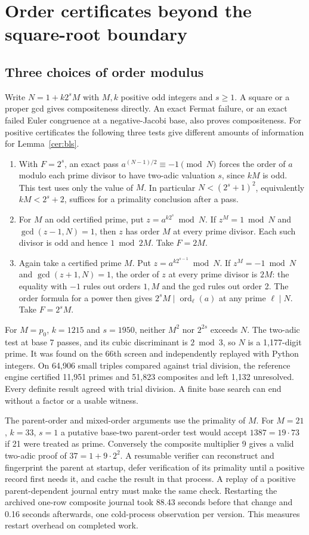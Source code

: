 \documentclass[11pt,a4paper,oneside,openany]{report}
\begin{document}
\chapter{Order certificates beyond the square-root boundary}
\label{cer:orderchap}
\section{Three choices of order modulus}

Write $N=1+k2^sM$ with $M,k$ positive odd integers and $s\ge1$. A square or a proper gcd gives compositeness directly. An exact Fermat failure, or an exact failed Euler congruence at a negative-Jacobi base, also proves compositeness. For positive certificates the following three tests give different amounts of information for Lemma~\ref{cer:bls}.
\begin{enumerate}
\item With $F=2^s$, an exact pass $a^{(N-1)/2}\equiv-1\pmod N$ forces the order of $a$ modulo each prime divisor to have two-adic valuation $s$, since $kM$ is odd. This test uses only the value of $M$. In particular $N<(2^s+1)^2$, equivalently $kM<2^s+2$, suffices for a primality conclusion after a pass.
\item For $M$ an odd certified prime, put $z=a^{k2^s}\bmod N$. If $z^M=1\bmod N$ and $\gcd(z-1,N)=1$, then $z$ has order $M$ at every prime divisor. Each such divisor is odd and hence $1\bmod 2M$. Take $F=2M$.
\item Again take a certified prime $M$. Put $z=a^{k2^{s-1}}\bmod N$. If $z^M=-1\bmod N$ and $\gcd(z+1,N)=1$, the order of $z$ at every prime divisor is $2M$: the equality with $-1$ rules out orders $1,M$ and the gcd rules out order 2. The order formula for a power then gives $2^sM\mid\operatorname{ord}_{\ell}(a)$ at any prime $\ell\mid N$. Take $F=2^sM$.
\end{enumerate}

For $M=p_0$, $k=1215$ and $s=1950$, neither $M^2$ nor $2^{2s}$ exceeds $N$. The two-adic test at base 7 passes, and its cubic discriminant is $2\bmod3$, so $N$ is a 1,177-digit prime. It was found on the 66th screen and independently replayed with Python integers. On 64,906 small triples compared against trial division, the reference engine certified 11,951 primes and 51,823 composites and left 1,132 unresolved. Every definite result agreed with trial division. A finite base search can end without a factor or a usable witness.

The parent-order and mixed-order arguments use the primality of $M$. For $M=21$, $k=33$, $s=1$ a putative base-two parent-order test would accept $1387=19\cdot73$ if 21 were treated as prime. Conversely the composite multiplier 9 gives a valid two-adic proof of $37=1+9\cdot2^2$. A resumable verifier can reconstruct and fingerprint the parent at startup, defer verification of its primality until a positive record first needs it, and cache the result in that process. A replay of a positive parent-dependent journal entry must make the same check. Restarting the archived one-row composite journal took 88.43 seconds before that change and 0.16 seconds afterwards, one cold-process observation per version. This measures restart overhead on completed work.
\end{document}

